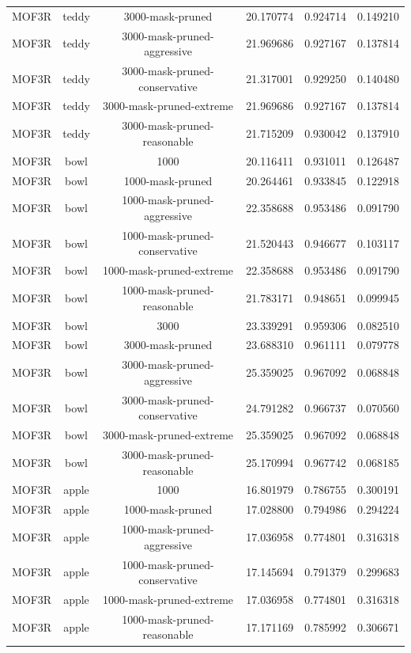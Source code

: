 \begin{table}[h!]
\begin{tabular}{c|c|c|c|c|c}
MOF3R & teddy & 3000-mask-pruned & 20.170774 & 0.924714 & 0.149210 \\
MOF3R & teddy & 3000-mask-pruned-aggressive & 21.969686 & 0.927167 & 0.137814 \\
MOF3R & teddy & 3000-mask-pruned-conservative & 21.317001 & 0.929250 & 0.140480 \\
MOF3R & teddy & 3000-mask-pruned-extreme & 21.969686 & 0.927167 & 0.137814 \\
MOF3R & teddy & 3000-mask-pruned-reasonable & 21.715209 & 0.930042 & 0.137910 \\
MOF3R & bowl & 1000 & 20.116411 & 0.931011 & 0.126487 \\
MOF3R & bowl & 1000-mask-pruned & 20.264461 & 0.933845 & 0.122918 \\
MOF3R & bowl & 1000-mask-pruned-aggressive & 22.358688 & 0.953486 & 0.091790 \\
MOF3R & bowl & 1000-mask-pruned-conservative & 21.520443 & 0.946677 & 0.103117 \\
MOF3R & bowl & 1000-mask-pruned-extreme & 22.358688 & 0.953486 & 0.091790 \\
MOF3R & bowl & 1000-mask-pruned-reasonable & 21.783171 & 0.948651 & 0.099945 \\
MOF3R & bowl & 3000 & 23.339291 & 0.959306 & 0.082510 \\
MOF3R & bowl & 3000-mask-pruned & 23.688310 & 0.961111 & 0.079778 \\
MOF3R & bowl & 3000-mask-pruned-aggressive & 25.359025 & 0.967092 & 0.068848 \\
MOF3R & bowl & 3000-mask-pruned-conservative & 24.791282 & 0.966737 & 0.070560 \\
MOF3R & bowl & 3000-mask-pruned-extreme & 25.359025 & 0.967092 & 0.068848 \\
MOF3R & bowl & 3000-mask-pruned-reasonable & 25.170994 & 0.967742 & 0.068185 \\
MOF3R & apple & 1000 & 16.801979 & 0.786755 & 0.300191 \\
MOF3R & apple & 1000-mask-pruned & 17.028800 & 0.794986 & 0.294224 \\
MOF3R & apple & 1000-mask-pruned-aggressive & 17.036958 & 0.774801 & 0.316318 \\
MOF3R & apple & 1000-mask-pruned-conservative & 17.145694 & 0.791379 & 0.299683 \\
MOF3R & apple & 1000-mask-pruned-extreme & 17.036958 & 0.774801 & 0.316318 \\
MOF3R & apple & 1000-mask-pruned-reasonable & 17.171169 & 0.785992 & 0.306671 \\

\end{tabular}
\end{table}
